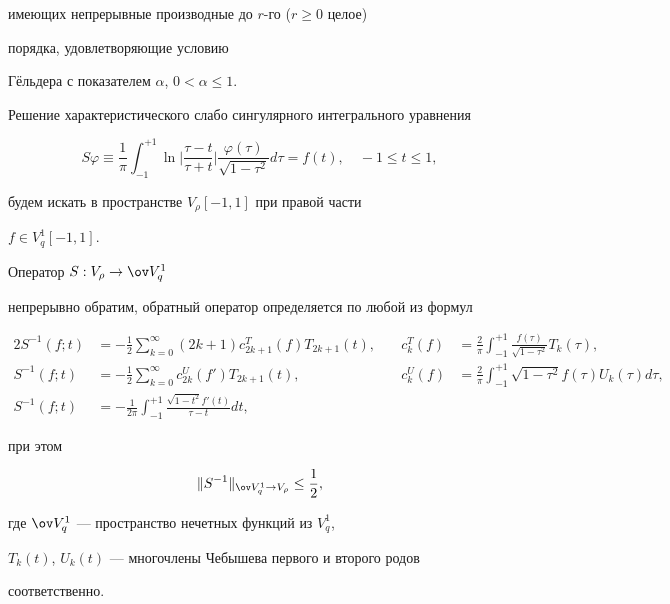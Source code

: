 имеющих непрерывные производные до $r$-го ($r \ge 0$ целое)


порядка, удовлетворяющие условию


Г\"ельдера с показателем $\alpha$, $0< \alpha \leq 1$.





Решение характеристического слабо сингулярного интегрального уравнения


$$


S\varphi\equiv\frac{1}{\pi}\int^{+1}_{-1}\ln\bigg|\frac{\tau-t}{\tau+t}


\bigg|


\frac{\varphi(\tau)}{\sqrt{1-\tau^2}}d\tau=f(t), \quad -1\leq t\leq 1,


$$


будем искать в пространстве $V_{\rho}[-1,1]$ при правой части


$f\in V_{q}^{1}[-1,1].$





\begin{thm}


Оператор $S:V_{\rho}\to\ov V_{q}^{1}$


непрерывно обратим, обратный оператор определяется по любой из формул


\begin{alignat*}{2}


S^{-1}(f;t)&=-\frac{1}{2}\sum_{k=0}^{\infty}(2k+1)


c_{2k+1}^T(f)T_{2k+1}(t), &\quad


c_k^T(f) &= \frac{2}{\pi}\int^{+1}_{-1}\frac{f(\tau)}{\sqrt{1-\tau^2}}


T_{k}(\tau),\\


%


S^{-1}(f;t)&=-\frac{1}{2}\sum_{k=0}^{\infty}


c_{2k}^U(f')T_{2k+1}(t), &\quad


c_k^U(f) &= \frac{2}{\pi}\int^{+1}_{-1}\sqrt{1-\tau^2}f(\tau)U_{k}


(\tau)d\tau,\\


%


S^{-1}(f;t)&=-\frac{1}{2\pi}\int^{+1}_{-1}


\frac{\sqrt{1-t^2}f'(t)}{\tau-t}dt, &\quad &\


\end{alignat*}


при этом


$$


\|S^{-1}\|_{\ov V_q^1 \rightarrow V_\rho} \leq \frac{1}{2},


$$


где $\ov V^1_q$ --- пространство нечетных функций из $V^1_q$,


$T_k(t)$, $U_k(t)$ --- многочлены Чебышева первого и второго родов


соответственно.


\end{thm}





